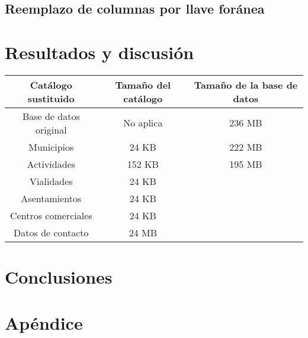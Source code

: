 \documentclass{article}
\begin{document}
\subsection{Reemplazo de columnas por llave foránea}


\section{Resultados y discusión}

\begin{table}[h!]
    \centering
\begin{tabular}{c|c|c}
    Catálogo sustituido & Tamaño del catálogo & Tamaño de la base de datos\\
    \hline
    Base de datos original & No aplica & 236 MB \\
    Municipios & 24 KB & 222 MB \\
    Actividades & 152 KB & 195 MB \\
    Vialidades & 24 KB & \\
    Asentamientos & 24 KB & \\
    Centros comerciales & 24 KB & \\
    Datos de contacto & 24 MB &
\end{tabular}
\end{table}

\section{Conclusiones}

\section*{Apéndice}


\end{document}
